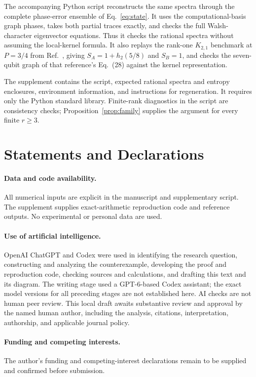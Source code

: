 \documentclass[11pt,a4paper]{article}
\begin{document}
The accompanying Python script reconstructs the same spectra through the
complete phase-error ensemble of Eq.~\eqref{eq:state}. It uses the
computational-basis graph phases, takes both partial traces exactly, and
checks the full Walsh-character eigenvector equations. Thus it checks the
rational spectra without assuming the local-kernel formula. It also replays
the rank-one $K_{2,1}$ benchmark at $P=3/4$ from
Ref.~\cite[Eqs.~(25)--(27)]{Sajjad2026lowerbounds}, giving
$S_A=1+h_2(5/8)$ and $S_B=1$, and checks the seven-qubit graph of that
reference's Eq.~(28) against the kernel representation.

The supplement contains the script, expected rational spectra and entropy
enclosures, environment information, and instructions for regeneration.
It requires only the Python standard library. Finite-rank diagnostics in the
script are consistency checks; Proposition~\ref{prop:family} supplies the
argument for every finite $r\geq3$.

\section*{Statements and Declarations}
\paragraph{Data and code availability.}
All numerical inputs are explicit in the manuscript and supplementary script.
The supplement supplies exact-arithmetic reproduction code and reference
outputs. No experimental or personal data are used.

\paragraph{Use of artificial intelligence.}
OpenAI ChatGPT and Codex were used in identifying the research question,
constructing and analyzing the counterexample, developing the proof and
reproduction code, checking sources and calculations, and drafting this text
and its diagram. The writing stage used a GPT-6-based Codex assistant;
the exact model versions for all preceding stages are not established here.
AI checks are not human peer review. This local draft awaits substantive
review and approval by the named human author, including the analysis,
citations, interpretation, authorship, and applicable journal policy.

\paragraph{Funding and competing interests.}
The author's funding and competing-interest declarations remain to be supplied
and confirmed before submission.



\end{document}
